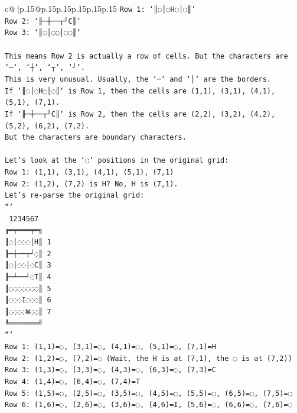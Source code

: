 \documentclass{article}
\begin{document}
{\begin{supertabular}{c@{$\;$}|p{.15\linewidth}@{}p{.15\linewidth}p{.15\linewidth}p{.15\linewidth}p{.15\linewidth}p{.15\linewidth}}
{{{\texttt{Row 1: `║◌│◌H◌│◌║`} \\
\texttt{Row 2: `╟─┼──┬┘C║`} \\
\texttt{Row 3: `║◌│◌◌│◌◌║`} \\
\\ 
\texttt{This means Row 2 is actually a row of cells. But the characters are `─`, `┼`, `┬`, `┘`.} \\
\texttt{This is very unusual. Usually, the `─` and `│` are the borders.} \\
\texttt{If `║◌│◌H◌│◌║` is Row 1, then the cells are (1,1), (3,1), (4,1), (5,1), (7,1).} \\
\texttt{If `╟─┼──┬┘C║` is Row 2, then the cells are (2,2), (3,2), (4,2), (5,2), (6,2), (7,2).} \\
\texttt{But the characters are boundary characters.} \\
\\ 
\texttt{Let's look at the `◌` positions in the original grid:} \\
\texttt{Row 1: (1,1), (3,1), (4,1), (5,1), (7,1)} \\
\texttt{Row 2: (1,2), (7,2) is H? No, H is (7,1).} \\
\texttt{Let's re{-}parse the original grid:} \\
\texttt{```} \\
\texttt{ 1234567} \\
\texttt{╔═╤═══╤═╗} \\
\texttt{║◌│◌◌◌│H║ 1} \\
\texttt{╟─┼──┬┘◌║ 2} \\
\texttt{║◌│◌◌│◌C║ 3} \\
\texttt{╟─┴──┘◌T║ 4} \\
\texttt{║◌◌◌◌◌◌◌║ 5} \\
\texttt{║◌◌◌I◌◌◌║ 6} \\
\texttt{║◌◌◌◌W◌◌║ 7} \\
\texttt{╚═══════╝} \\
\texttt{```} \\
\texttt{Row 1: (1,1)=◌, (3,1)=◌, (4,1)=◌, (5,1)=◌, (7,1)=H} \\
\texttt{Row 2: (1,2)=◌, (7,2)=◌ (Wait, the H is at (7,1), the ◌ is at (7,2))} \\
\texttt{Row 3: (1,3)=◌, (3,3)=◌, (4,3)=◌, (6,3)=◌, (7,3)=C} \\
\texttt{Row 4: (1,4)=◌, (6,4)=◌, (7,4)=T} \\
\texttt{Row 5: (1,5)=◌, (2,5)=◌, (3,5)=◌, (4,5)=◌, (5,5)=◌, (6,5)=◌, (7,5)=◌} \\
\texttt{Row 6: (1,6)=◌, (2,6)=◌, (3,6)=◌, (4,6)=I, (5,6)=◌, (6,6)=◌, (7,6)=◌} \\
}}}
\end{supertabular}}
\end{document}
